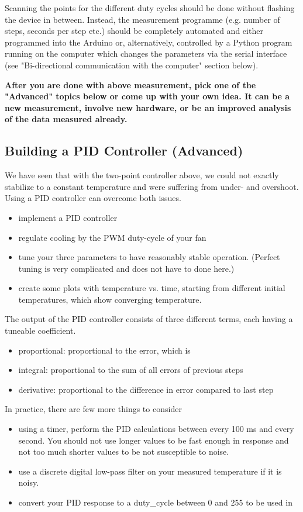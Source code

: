Scanning the points for the different duty cycles should be done without flashing the device in between. Instead, the measurement programme (e.g. number of steps, seconds per step etc.) should be completely automated and either programmed into the Arduino or, alternatively, controlled by a Python program running on the computer which changes the parameters via the serial interface (see "Bi-directional communication with the computer" section below).

\textbf{After you are done with above measurement, pick one of the "Advanced" topics below or come up with your own idea. It can be a new measurement, involve new hardware, or be an improved analysis of the data measured already.}

\subsection{Building a PID Controller (Advanced)}
We have seen that with the two-point controller above, we could not exactly stabilize to a constant temperature and were suffering from under- and overshoot. Using a \ac{PID} controller can overcome both issues.
\begin{itemize}
	\item implement a \ac{PID} controller
	\item regulate cooling by the PWM duty-cycle of your fan
	\item tune your three parameters to have reasonably stable operation. (Perfect tuning is very complicated and does not have to done here.)
	\item create some plots with temperature vs. time, starting from different initial temperatures, which show converging temperature.
\end{itemize}

The output of the PID controller consists of three different terms, each having a tuneable coefficient.
\begin{itemize}
	\item proportional: proportional to the error, which is 
	\item integral: proportional to the sum of all errors of previous steps
	\item derivative: proportional to the difference in error compared to last step
\end{itemize}

In practice, there are few more things to consider
\begin{itemize}
    \item using a timer, perform the PID calculations between every 100 ms and every second. You should not use longer values to be fast enough in response and not too much shorter values to be not susceptible to noise.
    \item use a discrete digital low-pass filter on your measured temperature if it is noisy.
    \item convert your PID response to a duty\_cycle between 0 and 255 to be used in 
\end{itemize}


